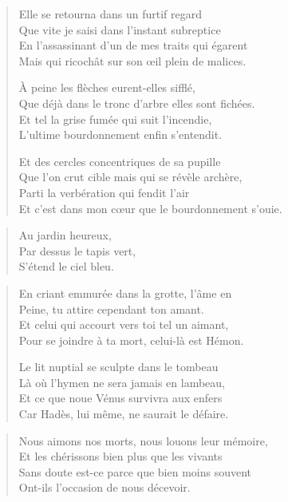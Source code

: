 \begin{verse}
Elle se retourna dans un furtif regard\\
Que vite je saisi dans l’instant subreptice\\
En l’assassinant d’un de mes traits qui égarent\\
Mais qui ricochât sur son œil plein de malices.

À peine les flèches eurent-elles sifflé,\\
Que déjà dans le tronc d’arbre elles sont fichées.\\
Et tel la grise fumée  qui suit  l’incendie,\\
L’ultime bourdonnement enfin s’entendit.

Et des cercles concentriques de sa pupille\\
Que l’on crut cible mais qui se révèle archère,\\
Parti la verbération qui fendit l’air\\
Et c’est dans mon cœur que le bourdonnement s’ouie.
\end{verse}



\begin{verse}
Au jardin heureux,\\
Par dessus le tapis  vert,\\
S’étend le ciel bleu.
\end{verse}

\begin{verse}
En criant emmurée dans la grotte, l’âme en\\
Peine, tu attire cependant ton amant.\\
Et celui qui accourt vers toi tel un aimant,\\
Pour se joindre à ta mort, celui-là est Hémon.

Le lit nuptial se sculpte dans le tombeau\\
Là où l’hymen ne sera jamais en lambeau,\\
Et ce que noue Vénus survivra aux enfers\\
Car Hadès, lui même, ne saurait le défaire.
\end{verse}

\begin{verse}
Nous aimons nos morts, nous louons leur mémoire,\\
Et les chérissons bien plus que les vivants\\
Sans doute est-ce parce que bien moins souvent\\
Ont-ils l’occasion de nous décevoir.
\end{verse}

